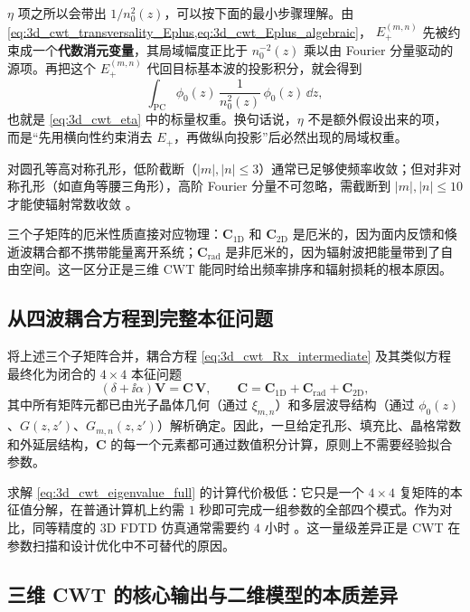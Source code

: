 $\eta$ 项之所以会带出 $1/n_0^2(z)$，可以按下面的最小步骤理解。由
\cref{eq:3d_cwt_transversality_Eplus,eq:3d_cwt_Eplus_algebraic}，
$E_+^{(m,n)}$ 先被约束成一个\textbf{代数消元变量}，其局域幅度正比于
$n_0^{-2}(z)$ 乘以由 Fourier 分量驱动的源项。再把这个 $E_+^{(m,n)}$
代回目标基本波的投影积分，就会得到
\[
\int_{\mathrm{PC}}
\phi_0(z)\,
\frac{1}{n_0^2(z)}\,
\phi_0(z)\,\dd z,
\]
也就是 \cref{eq:3d_cwt_eta} 中的标量权重。换句话说，$\eta$ 不是额外假设出来的项，
而是“先用横向性约束消去 $E_+$，再做纵向投影”后必然出现的局域权重。

对圆孔等高对称孔形，低阶截断（$|m|,|n|\leq 3$）通常已足够使频率收敛；但对非对称孔形（如直角等腰三角形），高阶 Fourier 分量不可忽略，需截断到 $|m|,|n|\leq 10$ 才能使辐射常数收敛 \cite{liang2012square}。

三个子矩阵的厄米性质直接对应物理：$\bm{C}_{\mathrm{1D}}$ 和 $\bm{C}_{\mathrm{2D}}$ 是厄米的，因为面内反馈和倏逝波耦合都不携带能量离开系统；$\bm{C}_{\mathrm{rad}}$ 是非厄米的，因为辐射波把能量带到了自由空间。这一区分正是三维 CWT 能同时给出频率排序和辐射损耗的根本原因。

\subsection{从四波耦合方程到完整本征问题}

将上述三个子矩阵合并，耦合方程 \cref{eq:3d_cwt_Rx_intermediate} 及其类似方程最终化为闭合的 $4\times4$ 本征问题
\begin{equation}
(\delta+\ii\alpha)\bm{V} = \bm{C}\,\bm{V},
\qquad
\bm{C} = \bm{C}_{\mathrm{1D}} + \bm{C}_{\mathrm{rad}} + \bm{C}_{\mathrm{2D}},
\label{eq:3d_cwt_eigenvalue_full}
\end{equation}
其中所有矩阵元都已由光子晶体几何（通过 $\xi_{m,n}$）和多层波导结构（通过 $\phi_0(z)$、$G(z,z')$、$G_{m,n}(z,z')$）解析确定。因此，一旦给定孔形、填充比、晶格常数和外延层结构，$\bm{C}$ 的每一个元素都可通过数值积分计算，原则上不需要经验拟合参数。

求解 \cref{eq:3d_cwt_eigenvalue_full} 的计算代价极低：它只是一个 $4\times4$ 复矩阵的本征值分解，在普通计算机上约需 $1$ 秒即可完成一组参数的全部四个模式。作为对比，同等精度的 3D FDTD 仿真通常需要约 $4$ 小时 \cite{liang2012square}。这一量级差异正是 CWT 在参数扫描和设计优化中不可替代的原因。

\subsection{三维 CWT 的核心输出与二维模型的本质差异}

